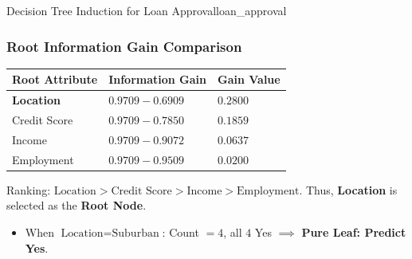 \begin{example}{Decision Tree Induction for Loan Approval}{loan_approval}
\subsubsection{Root Information Gain Comparison}
\begin{center}\renewcommand{\arraystretch}{1.35}
\begin{tabular}{lll}
\toprule
\textbf{Root Attribute} & \textbf{Information Gain} & \textbf{Gain Value} \\
\midrule
\textbf{Location} & $0.9709 - 0.6909$ & $\mathbf{0.2800}$ \\
Credit Score      & $0.9709 - 0.7850$ & $0.1859$ \\
Income            & $0.9709 - 0.9072$ & $0.0637$ \\
Employment        & $0.9709 - 0.9509$ & $0.0200$ \\
\bottomrule
\end{tabular}
\end{center}
Ranking: $\text{Location} > \text{Credit Score} > \text{Income} > \text{Employment}$.
Thus, \textbf{Location} is selected as the \textbf{Root Node}.
\begin{itemize}
    \item When $\text{Location} = \text{Suburban}$: Count $= 4$, all $4$ Yes $\implies$ \textbf{Pure Leaf: Predict Yes}.
\end{itemize}


\end{example}
